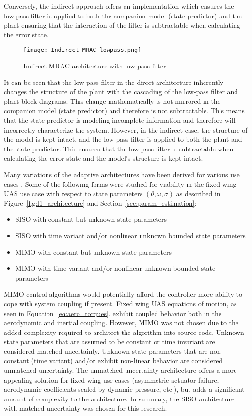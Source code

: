 Conversely, the indirect approach offers an implementation which ensures the low-pass filter is applied to both the companion model (state predictor) and the plant ensuring that the interaction of the filter is subtractable when calculating the error state.
\begin{figure}[h!]
 \centering
  \texttt{[image: Indirect\_MRAC\_lowpass.png]}
  \caption{Indirect \ac{MRAC} architecture with low-pass filter }
  \label{fig:indirect_mrac_lowpass}
\end{figure}

It can be seen that the low-pass filter in the direct architecture inherently changes the structure of the plant with the cascading of the low-pass filter and plant block diagrams.  This change mathematically is not mirrored in the companion model (state predictor) and therefore is not subtractable.  This means that the state predictor is modeling incomplete information and therefore will incorrectly characterize the system.  However, in the indirect case, the structure of the model is kept intact, and the low-pass filter is applied to both the plant and the state predictor.  This ensures that the low-pass filter is subtractable when calculating the error state and the model's structure is kept intact.  

Many variations of the \Lone adaptive architectures have been derived for various use cases \cite{hovakimyan2010l1}.  Some of the following forms were studied for viability in the fixed wing \ac{UAS} use case with respect to state parameters $(\theta, \omega, \sigma)$ as described in Figure~\ref{fig:l1_architecture} and Section~\ref{sec:param_estimation}:
\begin{itemize}
 \item \ac{SISO} with constant but unknown state parameters
 \item \ac{SISO} with time variant and/or nonlinear unknown bounded state parameters
 \item \ac{MIMO} with constant but unknown state parameters 
 \item \ac{MIMO} with time variant and/or nonlinear unknown bounded state parameters
\end{itemize}

\ac{MIMO} control algorithms would potentially afford the controller more ability to cope with system coupling if present.  Fixed wing \ac{UAS} equations of motion, as seen in Equation~\ref{eq:aero_torques}, exhibit coupled behavior both in the aerodynamic and inertial coupling.  However, \ac{MIMO} was not chosen due to the added complexity required to architect the algorithm into source code.  Unknown state parameters that are assumed to be constant or time invariant are considered matched uncertainty.  Unknown state parameters that are non-constant (time variant) and/or exhibit non-linear behavior are considered unmatched uncertainty.  The unmatched uncertainty architecture offers a more appealing solution for fixed wing use cases (asymmetric actuator failure, aerodynamic coefficients scaled by dynamic pressure, etc.), but adds a significant amount of complexity to the architecture.  In summary, the \ac{SISO} architecture with matched uncertainty was chosen for this research.  

